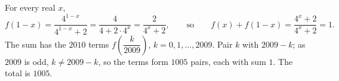 For every real $x$,
\[f(1-x)=\dfrac{4^{1-x}}{4^{1-x}+2}=\dfrac{4}{4+2\cdot4^x}=\dfrac{2}{4^x+2},\qquad\text{so}\qquad f(x)+f(1-x)=\dfrac{4^x+2}{4^x+2}=1.\]
The sum has the $2010$ terms $f\left(\dfrac{k}{2009}\right)$, $k=0,1,\dots,2009$. Pair $k$ with $2009-k$; as $2009$ is odd, $k\ne2009-k$, so the terms form $1005$ pairs, each with sum $1$. The total is $\boxed{1005}$.
